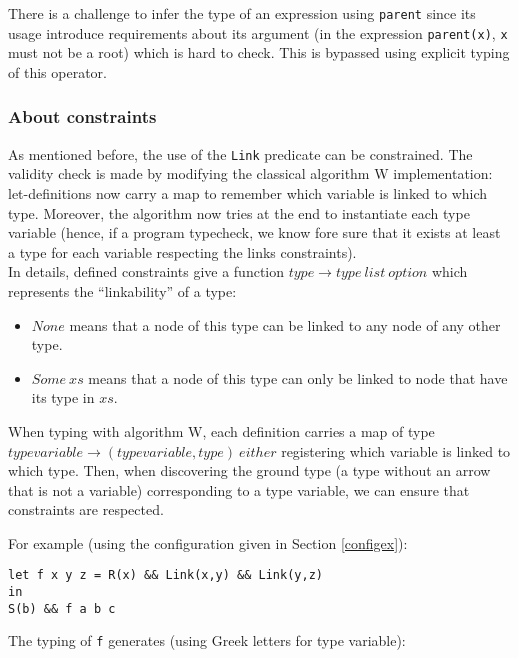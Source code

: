 \documentclass[10pt,a4paper]{article}
\newcommand{\ocaml}{\texttt}
\begin{document}
There is a challenge to infer the type of an expression using \ocaml{parent} since its usage introduce requirements about its argument (in the expression \ocaml{parent(x)}, \ocaml{x} must not be a root) which is hard to check. This is bypassed using explicit typing of this operator.

\subsubsection{About constraints}
As mentioned before, the use of the \ocaml{Link} predicate can be constrained. The validity check is made by modifying the classical algorithm W implementation: let-definitions now carry a map to remember which variable is linked to which type. Moreover, the algorithm now tries at the end to instantiate each type variable (hence, if a program typecheck, we know fore sure that it exists at least a type for each variable respecting the links constraints).\\

In details, defined constraints give a function $type \to type\ list\ option$ which represents the ``linkability'' of a type:
\begin{itemize}
\item $None$ means that a node of this type can be linked to any node of any other type.
\item $Some\ xs$ means that a node of this type can only be linked to node that have its type in $xs$.
\end{itemize}
When typing with algorithm W, each definition carries a map of type $typevariable \to (typevariable, type)\ either$ registering which variable is linked to which type. Then, when discovering the ground type (a type without an arrow that is not a variable) corresponding to a type variable, we can ensure that constraints are respected.

For example (using the configuration given in Section \ref{configex}):
\begin{verbatim}
let f x y z = R(x) && Link(x,y) && Link(y,z)
in
S(b) && f a b c
\end{verbatim}
The typing of \ocaml{f} generates (using Greek letters for type variable):\\

\begin{figure}[H]
  \centering
  \quad\quad
\end{figure}
\end{document}
